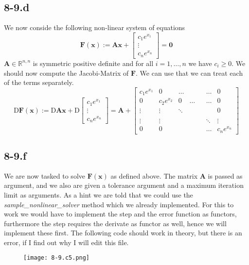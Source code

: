\documentclass{article}
\begin{document}
\subsection*{8-9.d} We now conside the following non-linear system of equations
\begin{equation*}
    \mathbf{F}\left(\mathbf{x}\right) := \mathbf{A}\mathbf{x} + \begin{bmatrix}
        c_{1}e^{x_{1}} \\
        \vdots 
        \\
        c_{n}e^{x_{n}} 
    \end{bmatrix}= \mathbf{0}
\end{equation*}
$\mathbf{A}\in \mathbb{R}^{n,n}$ is symmetric positive definite and for all $i = 1, \dots, n $ we have $c_{i} \geq 0$. We should now compute the Jacobi-Matrix of $\mathbf{F}$. We can use that we can treat each of the terms separately.
\begin{equation*}
    \mathrm{D}\mathbf{F}\left(\mathbf{x}\right) := \mathrm{D}\mathbf{A}\mathbf{x} + \mathrm{D}\begin{bmatrix}
        c_{1}e^{x_{1}} \\
        \vdots 
        \\
        c_{n}e^{x_{n}} 
    \end{bmatrix} = \mathbf{A} + \begin{bmatrix}
        c_{1}e^{x_{1}} & 0 & \dots && & \dots & 0 \\
        0 & c_{2}e^{x_{2}} & 0& \dots && \dots & 0 \\
        \vdots & \vdots & \ddots & & & & 0 \\
        \\
        \vdots & \vdots &  & & &\ddots & \vdots \\
        0 & 0 &&&& \dots & c_{n}e^{x_{n}}
    \end{bmatrix}
\end{equation*}
\subsection*{8-9.f} 
We are now tasked to solve $\mathbf{F}\left(\mathbf{x}\right)$ as defined above. The matrix $\mathbf{A}$ is passed as argument, and we also are given a tolerance argument and a maximum iteration limit as arguments. As a hint we are told that we could use the \textit{sample\_nonlinear\_solver} method which we already implemented. For this to work we would have to implement the step and the error function as functors, furthermore the step requires the derivate as functor as well, hence we will implement these first. The following code should work in theory, but there is an error, if I find out why I will edit this file.
\begin{figure}[!hbt]
    \centering
    \texttt{[image: 8-9.c5.png]}
\end{figure}
\end{document}
